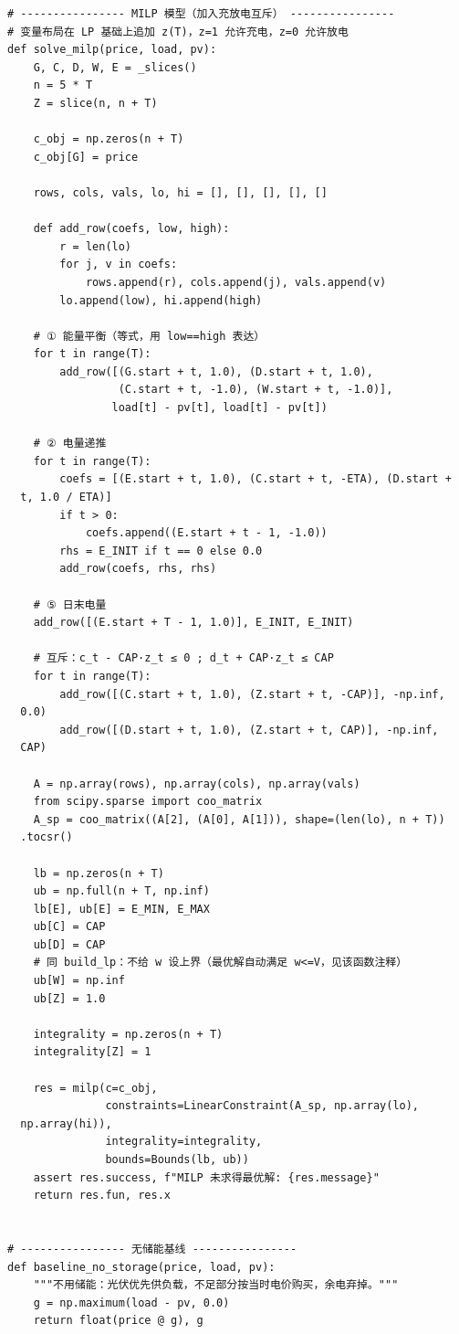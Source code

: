 \begin{verbatim}
# ---------------- MILP 模型（加入充放电互斥） ----------------
# 变量布局在 LP 基础上追加 z(T)，z=1 允许充电，z=0 允许放电
def solve_milp(price, load, pv):
    G, C, D, W, E = _slices()
    n = 5 * T
    Z = slice(n, n + T)

    c_obj = np.zeros(n + T)
    c_obj[G] = price

    rows, cols, vals, lo, hi = [], [], [], [], []

    def add_row(coefs, low, high):
        r = len(lo)
        for j, v in coefs:
            rows.append(r), cols.append(j), vals.append(v)
        lo.append(low), hi.append(high)

    # ① 能量平衡（等式，用 low==high 表达）
    for t in range(T):
        add_row([(G.start + t, 1.0), (D.start + t, 1.0),
                 (C.start + t, -1.0), (W.start + t, -1.0)],
                load[t] - pv[t], load[t] - pv[t])

    # ② 电量递推
    for t in range(T):
        coefs = [(E.start + t, 1.0), (C.start + t, -ETA), (D.start +
  t, 1.0 / ETA)]
        if t > 0:
            coefs.append((E.start + t - 1, -1.0))
        rhs = E_INIT if t == 0 else 0.0
        add_row(coefs, rhs, rhs)

    # ⑤ 日末电量
    add_row([(E.start + T - 1, 1.0)], E_INIT, E_INIT)

    # 互斥：c_t - CAP·z_t ≤ 0 ; d_t + CAP·z_t ≤ CAP
    for t in range(T):
        add_row([(C.start + t, 1.0), (Z.start + t, -CAP)], -np.inf,
  0.0)
        add_row([(D.start + t, 1.0), (Z.start + t, CAP)], -np.inf,
  CAP)

    A = np.array(rows), np.array(cols), np.array(vals)
    from scipy.sparse import coo_matrix
    A_sp = coo_matrix((A[2], (A[0], A[1])), shape=(len(lo), n + T))
  .tocsr()

    lb = np.zeros(n + T)
    ub = np.full(n + T, np.inf)
    lb[E], ub[E] = E_MIN, E_MAX
    ub[C] = CAP
    ub[D] = CAP
    # 同 build_lp：不给 w 设上界（最优解自动满足 w<=V，见该函数注释）
    ub[W] = np.inf
    ub[Z] = 1.0

    integrality = np.zeros(n + T)
    integrality[Z] = 1

    res = milp(c=c_obj,
               constraints=LinearConstraint(A_sp, np.array(lo),
  np.array(hi)),
               integrality=integrality,
               bounds=Bounds(lb, ub))
    assert res.success, f"MILP 未求得最优解: {res.message}"
    return res.fun, res.x


# ---------------- 无储能基线 ----------------
def baseline_no_storage(price, load, pv):
    """不用储能：光伏优先供负载，不足部分按当时电价购买，余电弃掉。"""
    g = np.maximum(load - pv, 0.0)
    return float(price @ g), g



\end{verbatim}
